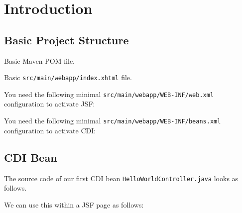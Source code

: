 %

\chapter{Introduction}

\section{Basic Project Structure}
Basic Maven POM file.


Basic \texttt{src/main/webapp/index.xhtml} file.


You need the following minimal \texttt{src/main/webapp/WEB-INF/web.xml} configuration to activate JSF:


You need the following minimal \texttt{src/main/webapp/WEB-INF/beans.xml} configuration to activate CDI:


\section{CDI Bean}

The source code of our first CDI bean \texttt{HelloWorldController.java} looks as follows.


We can use this within a JSF page as follows:
